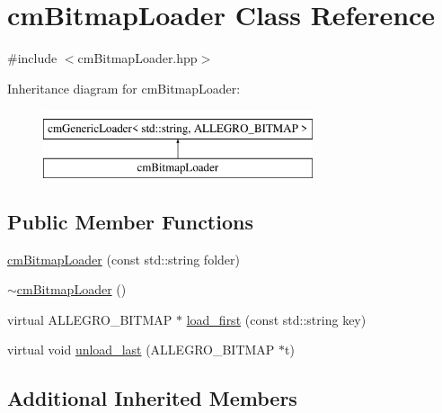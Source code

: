 \hypertarget{classcm_bitmap_loader}{\section{cm\-Bitmap\-Loader Class Reference}
\label{classcm_bitmap_loader}
}


{\ttfamily \#include $<$cm\-Bitmap\-Loader.\-hpp$>$}

Inheritance diagram for cm\-Bitmap\-Loader\-:\begin{figure}[H]
\begin{center}
\leavevmode
\includegraphics[height=2.000000cm]{classcm_bitmap_loader}
\end{center}
\end{figure}
\subsection*{Public Member Functions}
\begin{DoxyCompactItemize}
\item 
\hyperlink{classcm_bitmap_loader_a121ae526c2195c43f2a3dc4fbd50a94d}{cm\-Bitmap\-Loader} (const std\-::string folder)
\item 
\hyperlink{classcm_bitmap_loader_acea454cfbd6c8ef44e68b263b5aa612f}{$\sim$cm\-Bitmap\-Loader} ()
\item 
virtual A\-L\-L\-E\-G\-R\-O\-\_\-\-B\-I\-T\-M\-A\-P $\ast$ \hyperlink{classcm_bitmap_loader_a76f078f0497079e85c4a28cbfeb33521}{load\-\_\-first} (const std\-::string key)
\item 
virtual void \hyperlink{classcm_bitmap_loader_a6b8f77dab73ef47f20400e9fe576c755}{unload\-\_\-last} (A\-L\-L\-E\-G\-R\-O\-\_\-\-B\-I\-T\-M\-A\-P $\ast$t)
\end{DoxyCompactItemize}
\subsection*{Additional Inherited Members}


